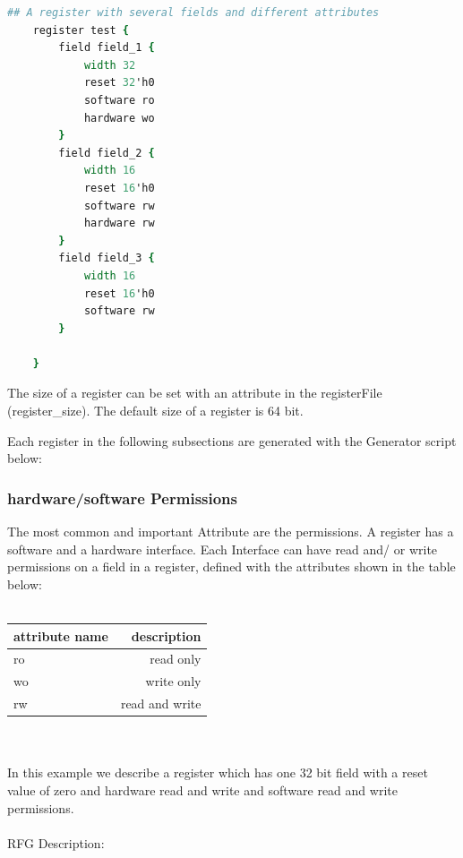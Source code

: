\documentclass[12pt,a4paper]{article}
\begin{document}
\begin{lstlisting}[linewidth=\textwidth,language=tcl,basicstyle=\small,tabsize=4]
    ## A register with several fields and different attributes
    register test {
        field field_1 {
            width 32
            reset 32'h0
            software ro
            hardware wo
        }
        field field_2 {
            width 16
            reset 16'h0
            software rw
            hardware rw
        }
        field field_3 {
            width 16
            reset 16'h0
            software rw
        }

    }
\end{lstlisting}

The size of a register can be set with an attribute in the registerFile (register\_size). The default size of a register is 64 bit.

Each register in the following subsections are generated with the Generator script below:



\newpage

\subsubsection{hardware/software Permissions}

The most common and important Attribute are the permissions. A register has a software and a hardware interface. Each Interface can have read and/ or write permissions on a field in a register, defined with the attributes shown in the table below:\\
\\
\begin{tabular}{ l | r }
attribute name & description \\ \hline
ro & read only \\ \hline
wo & write only \\ \hline
rw & read and write \\ \hline
\end{tabular}
\\
\\
In this example we describe a register which has one 32 bit field with a reset value of zero and hardware read and write and software read and write permissions.\\
\\
RFG Description:

\end{document}
